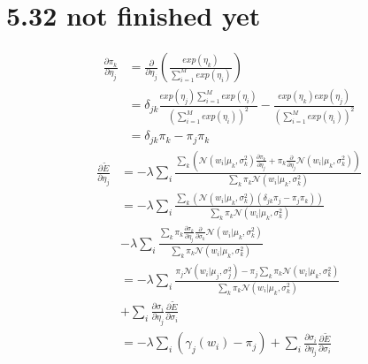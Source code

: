 \documentclass[10pt,a4paper,draft]{book}
\begin{document}
\section*{5.32 not finished yet}
\begin{equation}
\begin{aligned}
\frac{\partial \pi_k}{\partial \eta_j} &= \frac{\partial}{\partial \eta_j} \left( \frac{exp(\eta_k)}{\sum_{i=1}^{M}exp(\eta_i)} \right)\\
&= \delta_{jk}\frac{exp(\eta_j)\sum_{i=1}^{M}exp(\eta_i)}{(\sum_{i=1}^{M}exp(\eta_i))^2} -\frac{exp(\eta_k)exp(\eta_j)}{(\sum_{i=1}^{M}exp(\eta_i))^2} \\
&= \delta_{jk}\pi_k - \pi_j\pi_k
\end{aligned} 
\end{equation}
\begin{equation}
\begin{aligned}
\frac{\partial \tilde{E}}{\partial \eta_j} &=  - \lambda \sum_i \frac{\sum_k (\mathcal{N}(w_i|\mu_k,\sigma_k^2)\frac{\partial \pi_k}{\partial \eta_j} + \pi_k \frac{\partial}{\partial \eta_j}\mathcal{N}(w_i|\mu_k,\sigma^2_k))}{\sum_k \pi_k \mathcal{N}(w_i|\mu_k,\sigma^2_k)} \\ 
&=  - \lambda \sum_i \frac{\sum_k (\mathcal{N}(w_i|\mu_k,\sigma_k^2)(\delta_{jk}\pi_j - \pi_j\pi_k))}{\sum_k \pi_k \mathcal{N}(w_i|\mu_k,\sigma^2_k)} \\&- \lambda \sum_i \frac{\sum_k \pi_k \frac{\partial \sigma_k}{\partial \eta_j}\frac{\partial}{\partial  \sigma_k}\mathcal{N}(w_i|\mu_k,\sigma^2_k)}{\sum_k \pi_k \mathcal{N}(w_i|\mu_k,\sigma^2_k)} \\
&=  - \lambda \sum_i \frac{\pi_j\mathcal{N}(w_i|\mu_j,\sigma_j^2) - \pi_j\sum_k\pi_k\mathcal{N}(w_i|\mu_k,\sigma_k^2)}{\sum_k \pi_k \mathcal{N}(w_i|\mu_k,\sigma^2_k)} \\&+ \sum_i \frac{\partial\sigma_i}{\partial \eta_j}\frac{\partial \tilde{E}}{\partial \sigma_i} \\
&=  - \lambda \sum_i (\gamma_j(w_i) - \pi_j)+\sum_i \frac{\partial\sigma_i}{\partial \eta_j}\frac{\partial \tilde{E}}{\partial \sigma_i}
\end{aligned} 
\end{equation}
\end{document}
